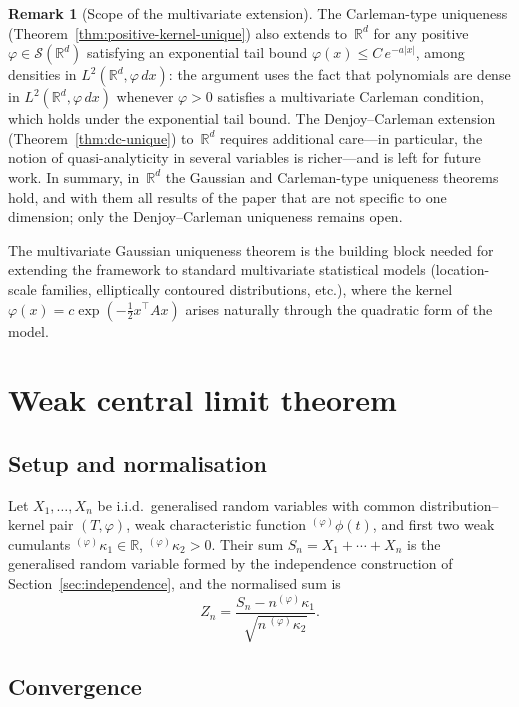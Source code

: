 \documentclass[12pt]{article}
\theoremstyle{definition}
\newtheorem{remark}[theorem]{Remark}
\newcommand{\R}{\mathbb{R}}
\begin{document}
\begin{remark}[Scope of the multivariate extension]
\label{rem:multivariate-scope}
The Carleman-type uniqueness (Theorem~\ref{thm:positive-kernel-unique})
also extends to~$\R^d$ for any positive $\varphi\in\mathcal{S}(\R^d)$
satisfying an exponential tail bound $\varphi(x)\le C\,e^{-a|x|}$,
among densities in $L^2(\R^d,\varphi\,dx)$: the argument uses the fact
that polynomials are dense in $L^2(\R^d,\varphi\,dx)$ whenever
$\varphi>0$ satisfies a multivariate Carleman condition, which holds
under the exponential tail bound.  The Denjoy--Carleman
extension (Theorem~\ref{thm:dc-unique}) to~$\R^d$ requires additional
care---in particular, the notion of quasi-analyticity in several variables
is richer---and is left for future work.  In summary, in~$\R^d$ the Gaussian
and Carleman-type uniqueness theorems hold, and with them all results of the
paper that are not specific to one dimension; only the Denjoy--Carleman
uniqueness remains open.

The multivariate Gaussian uniqueness theorem is the building block needed
for extending the framework to standard multivariate statistical models
(location-scale families, elliptically contoured distributions, etc.),
where the kernel $\varphi(x) = c\exp(-\frac{1}{2}x^{\!\top\!}Ax)$ arises
naturally through the quadratic form of the model.
\end{remark}


\section{Weak central limit theorem}
\label{sec:clt}

\subsection{Setup and normalisation}
\label{subsec:clt_setup}

Let $X_1,\dots,X_n$ be i.i.d.\ generalised random variables with common distribution--kernel pair $(T,\varphi)$, weak characteristic function ${}^{(\varphi)}\phi(t)$, and first two weak cumulants ${}^{(\varphi)}\kappa_1 \in \R$, ${}^{(\varphi)}\kappa_2 > 0$.  Their sum $S_n = X_1+\cdots+X_n$ is the generalised random variable formed by the independence construction of Section~\ref{sec:independence}, and the normalised sum is
\[
Z_n = \frac{S_n - n{}^{(\varphi)}\kappa_1}{\sqrt{n\,{}^{(\varphi)}\kappa_2}}.
\]

\subsection{Convergence}
\label{subsec:clt_convergence}
\end{document}
